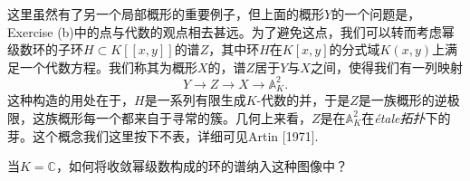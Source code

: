 这里虽然有了另一个局部概形的重要例子，但上面的概形$Y$的一个问题是，Exercise {\thethm}(b)中的点与代数的观点相去甚远。为了避免这点，我们可以转而考虑幂级数环的子环$H\subset K[\![x,y]\!]$的谱$Z$，其中环$H$在$K[x,y]$的分式域$K(x,y)$上满足一个代数方程。我们称其为概形$X$的，谱$Z$居于$Y$与$X$之间，使得我们有一列映射
\[
	Y\to Z\to X\to \mathbb{A}_K^2.
\]
这种构造的用处在于，$H$是一系列有限生成$K$\hyp 代数的并，于是$Z$是一族概形的逆极限，这族概形每一个都来自于寻常的簇。几何上来看，$Z$是在$\mathbb{A}_K^2$在\textit{\'{e}tale拓扑}下的芽。这个概念我们这里按下不表，详细可见Artin [1971].

\begin{exe}
	当$K=\mathbb{C}$，如何将收敛幂级数构成的环的谱纳入这种图像中？
\end{exe}